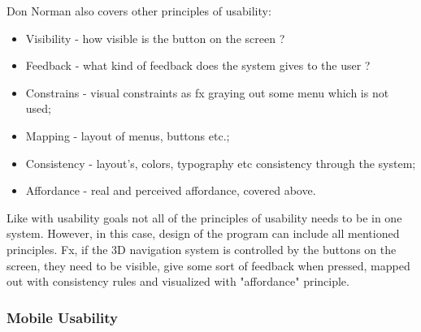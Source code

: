 Don Norman also covers other principles of usability:
\begin{itemize}
\item Visibility - how visible is the button on the screen ?
\item Feedback - what kind of feedback does the system gives to the user ?
\item Constrains - visual constraints as fx graying out some menu which is not 
used;
\item Mapping - layout of menus, buttons etc.;
\item Consistency - layout’s, colors, typography etc consistency through the 
system;
\item Affordance  - real and perceived affordance, covered above.
\end{itemize}

\cite {Normans}

Like with usability goals not all of the principles of usability needs to be in 
one system. However, in this case, design of the program can include all 
mentioned principles. Fx, if the 3D navigation system is controlled by the 
buttons on the screen, they need to be visible, give some sort of feedback when 
pressed, mapped out with consistency rules and visualized with "affordance" 
principle. 

\subsubsection{Mobile Usability}

